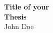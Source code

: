 \thispagestyle{empty}
\begin{center}
\Huge{\textbf{Title of your}} \\
\Huge{\textbf{Thesis}} \\
\vspace*{1cm}
\vspace*{1cm}
\vspace*{\fill}
\large{John Doe}\\
\end{center}

\newpage
\thispagestyle{empty}
\vspace*{\fill}
